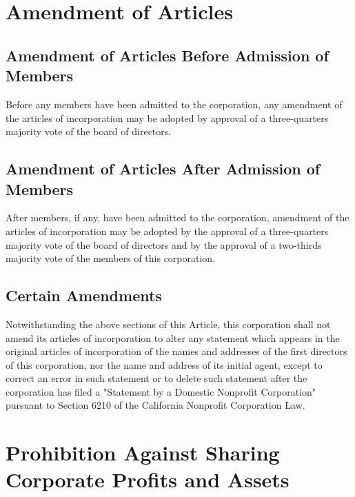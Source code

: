 \documentclass{article}
\begin{document}
	\section{Amendment of Articles}	
	\subsection{Amendment of Articles Before Admission of Members}
	Before any members have been admitted to the corporation, any amendment of the articles of incorporation may be adopted by approval of a three-quarters majority vote of the board of directors.
	\subsection{Amendment of Articles After Admission of Members}
	After members, if any, have been admitted to the corporation, amendment of the articles of incorporation may be adopted by the approval of a three-quarters majority vote of the board of directors and by the approval of a two-thirds majority vote of the members of this corporation.
	\subsection{Certain Amendments}
	Notwithstanding the above sections of this Article, this corporation shall not amend its articles of incorporation to alter any statement which appears in the original articles of incorporation of the names and addresses of the first directors of this corporation, nor the name and address of its initial agent, except to correct an error in such statement or to delete such statement after the corporation has filed a "Statement by a Domestic Nonprofit Corporation" pursuant to Section 6210 of the California Nonprofit Corporation Law.
	
	\section{Prohibition Against Sharing Corporate Profits and Assets}
\end{document}
